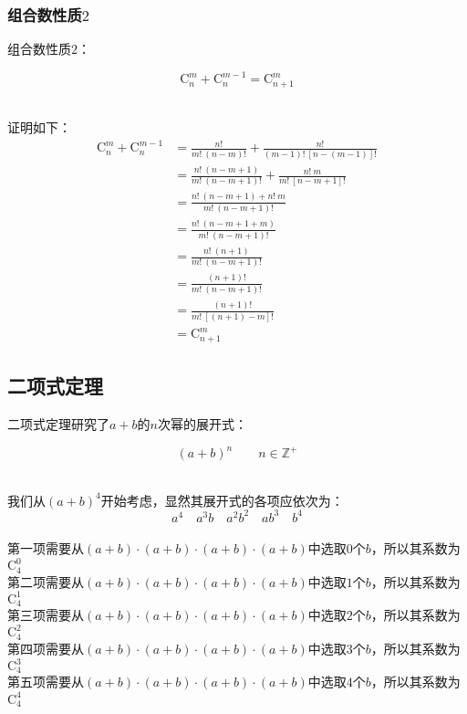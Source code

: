 \documentclass[UTF8]{ctexart}
\begin{document}
\subsubsection{组合数性质$2$}
    组合数性质$2$：
    \begin{large}
        \begin{equation*}
            \mathrm{C}_{n}^{m}+\mathrm{C}_{n}^{m-1}=\mathrm{C}_{n+1}^{m}
        \end{equation*}
    \end{large}\\
    证明如下：
    \setcounter{equation}{0}
    \begin{align}
        \mathrm{C}_{n}^{m}+\mathrm{C}_{n}^{m-1}
        &=\frac{n!}{m!~(n-m)!}+\frac{n!}{(m-1)!~[n-(m-1)]!}\\[3mm]
        &=\frac{n!~(n-m+1)}{m!~(n-m+1)!}+\frac{n!~m}{m!~[n-m+1]!}\\[3mm]
        &=\frac{n!~(n-m+1)+n!~m}{m!~(n-m+1)!}\\[3mm]
        &=\frac{n!~(n-m+1+m)}{m!~(n-m+1)!}\\[3mm]
        &=\frac{n!~(n+1)}{m!~(n-m+1)!}\\[3mm]
        &=\frac{(n+1)!}{m!~(n-m+1)!}\\[3mm]
        &=\frac{(n+1)!}{m!~[(n+1)-m]!}\\[3mm]
        &=\mathrm{C}_{n+1}^{m}
    \end{align}

\subsection{二项式定理}
    二项式定理研究了$a+b$的$n$次幂的展开式：
    \begin{large}
        \begin{equation*}
            (a+b)^n\qquad n\in\mathbb{Z^+}
        \end{equation*}
    \end{large}\\
    \setcounter{equation}{0}
    我们从$(a+b)^4$开始考虑，显然其展开式的各项应依次为：
    \begin{equation}
        a^4\quad a^3b\quad a^2b^2\quad ab^3\quad b^4
    \end{equation}\\
    第一项需要从$(a+b)\cdot(a+b)\cdot(a+b)\cdot(a+b)$中选取$0$个$b$，所以其系数为$\mathrm{C}_4^0$\\[1mm]
    第二项需要从$(a+b)\cdot(a+b)\cdot(a+b)\cdot(a+b)$中选取$1$个$b$，所以其系数为$\mathrm{C}_4^1$\\[1mm]
    第三项需要从$(a+b)\cdot(a+b)\cdot(a+b)\cdot(a+b)$中选取$2$个$b$，所以其系数为$\mathrm{C}_4^2$\\[1mm]
    第四项需要从$(a+b)\cdot(a+b)\cdot(a+b)\cdot(a+b)$中选取$3$个$b$，所以其系数为$\mathrm{C}_4^3$\\[1mm]
    第五项需要从$(a+b)\cdot(a+b)\cdot(a+b)\cdot(a+b)$中选取$4$个$b$，所以其系数为$\mathrm{C}_4^4$
\end{document}
